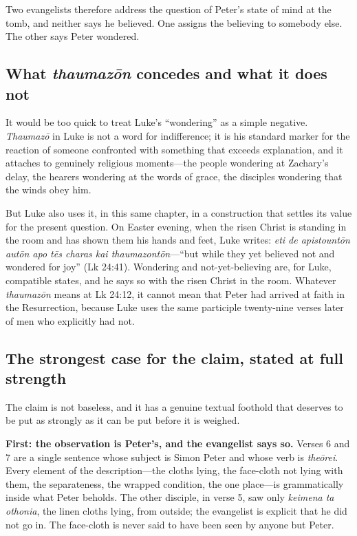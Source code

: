 Two evangelists therefore address the question of Peter's state of mind at the
tomb, and neither says he believed. One assigns the believing to somebody
else. The other says Peter wondered.

\subsection{What \emph{thaumaz\=on} concedes and what it does not}

It would be too quick to treat Luke's ``wondering'' as a simple negative.
\emph{Thaumaz\=o} in Luke is not a word for indifference; it is his standard
marker for the reaction of someone confronted with something that exceeds
explanation, and it attaches to genuinely religious moments---the people
wondering at Zachary's delay, the hearers wondering at the words of grace, the
disciples wondering that the winds obey him.

But Luke also uses it, in this same chapter, in a construction that settles its
value for the present question. On Easter evening, when the risen Christ is
standing in the room and has shown them his hands and feet, Luke writes:
\emph{eti de apistount\=on aut\=on apo t\=es charas kai thaumazont\=on}---``but
while they yet believed not and wondered for joy'' (Lk 24:41). Wondering and
not-yet-believing are, for Luke, compatible states, and he says so with the
risen Christ in the room. Whatever \emph{thaumaz\=on} means at Lk 24:12, it
cannot mean that Peter had arrived at faith in the Resurrection, because Luke
uses the same participle twenty-nine verses later of men who explicitly had
not.

\subsection{The strongest case for the claim, stated at full strength}

The claim is not baseless, and it has a genuine textual foothold that deserves
to be put as strongly as it can be put before it is weighed.

\textbf{First: the observation is Peter's, and the evangelist says so.} Verses
6 and 7 are a single sentence whose subject is Simon Peter and whose verb is
\emph{the\=orei}. Every element of the description---the cloths lying, the
face-cloth not lying with them, the separateness, the wrapped condition, the
one place---is grammatically inside what Peter beholds. The other disciple, in
verse 5, saw only \emph{keimena ta othonia}, the linen cloths lying, from
outside; the evangelist is explicit that he did not go in. The face-cloth is
never said to have been seen by anyone but Peter.

